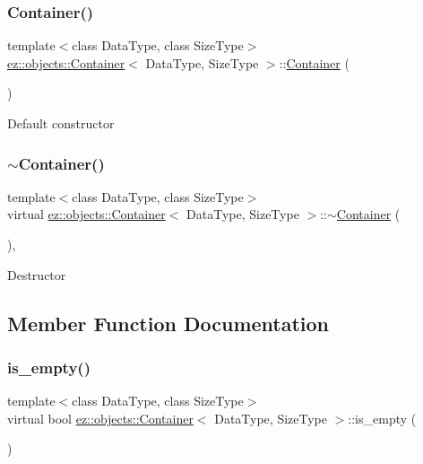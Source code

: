 \subsubsection{\texorpdfstring{Container()}{Container()}}
{\footnotesize\ttfamily template$<$class Data\+Type, class Size\+Type$>$ \\
\hyperlink{classez_1_1objects_1_1Container}{ez\+::objects\+::\+Container}$<$ Data\+Type, Size\+Type $>$\+::\hyperlink{classez_1_1objects_1_1Container}{Container} (\begin{DoxyParamCaption}{ }\end{DoxyParamCaption})\hspace{0.3cm}{\ttfamily [inline]}}

Default constructor \mbox{\label{classez_1_1objects_1_1Container_a26449bfdccdbf9aea44bc5973a085ff8}} 
\subsubsection{\texorpdfstring{$\sim$\+Container()}{~Container()}}
{\footnotesize\ttfamily template$<$class Data\+Type, class Size\+Type$>$ \\
virtual \hyperlink{classez_1_1objects_1_1Container}{ez\+::objects\+::\+Container}$<$ Data\+Type, Size\+Type $>$\+::$\sim$\hyperlink{classez_1_1objects_1_1Container}{Container} (\begin{DoxyParamCaption}{ }\end{DoxyParamCaption})\hspace{0.3cm}{\ttfamily [inline]}, {\ttfamily [virtual]}}

Destructor 

\subsection{Member Function Documentation}
\mbox{\label{classez_1_1objects_1_1Container_a205eb4f8a4fe967d425fdf04e5db5f93}} 
\subsubsection{\texorpdfstring{is\+\_\+empty()}{is\_empty()}}
{\footnotesize\ttfamily template$<$class Data\+Type, class Size\+Type$>$ \\
virtual bool \hyperlink{classez_1_1objects_1_1Container}{ez\+::objects\+::\+Container}$<$ Data\+Type, Size\+Type $>$\+::is\+\_\+empty (\begin{DoxyParamCaption}{ }\end{DoxyParamCaption})\hspace{0.3cm}{\ttfamily [pure virtual]}}

